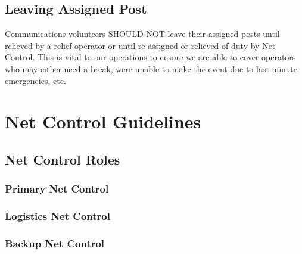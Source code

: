 \documentclass[pdflatex,letterpaper,twoside,12pt]{book}
\begin{document}
\section{Leaving Assigned Post}

Communications volunteers SHOULD NOT leave their assigned posts until relieved by a relief operator or until re-assigned or relieved of duty by Net Control. This is vital to our operations to ensure we are able to cover operators who may either need a break, were unable to make the event due to last minute emergencies, etc.


\chapter{Net Control Guidelines}


\section{Net Control Roles}

\subsection{Primary Net Control}

\iffalse %
Describe role, types of traffic, etc
\fi

\subsection{Logistics Net Control}

\iffalse %
Describe role, types of traffic, etc
\fi

\subsection{Backup Net Control}
\end{document}

